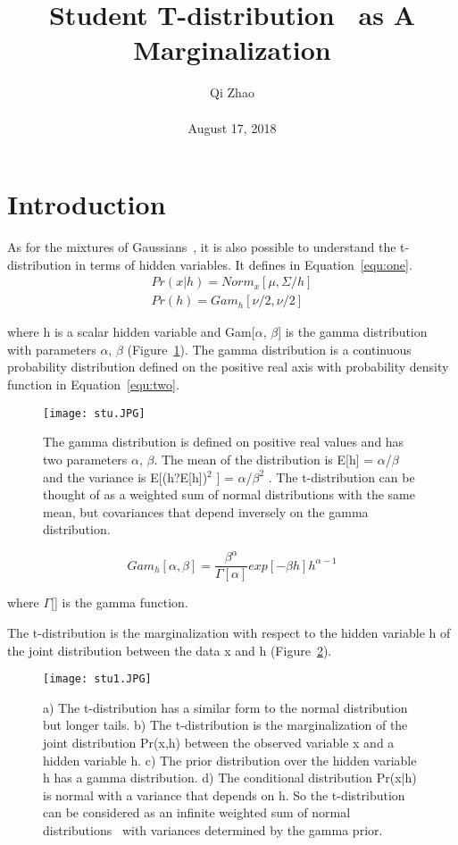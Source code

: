 \documentclass[10pt,twocolumn,letterpaper]{article}
\begin{document}
\title{ Student T-distribution~\cite{Jones2010A} as A Marginalization}
\author{Qi Zhao\\\\August 17, 2018}

\maketitle
\section{Introduction}
 As for the mixtures of Gaussians~\cite{Portilla2003Image}, it is also possible to understand the t-distribution in terms of hidden variables. It defines in Equation~\ref{equ:one}.
\begin{equation}
\begin{split}
Pr(x|h) = Norm_x[\mu, \Sigma/h] \\
Pr(h) = Gam_h[\nu/2, \nu/2]
\end{split}
\label{equ:one}
\end{equation} 

where h is a scalar hidden variable and Gam[$\alpha$, $\beta$] is the gamma distribution~\cite{Stacy1962A} with parameters $\alpha$, $\beta$ (Figure~\ref{fig:one}). The gamma distribution is a continuous probability distribution defined on the positive real axis with probability density function in Equation~\ref{equ:two}.
\begin{figure}[H]
\centering
\texttt{[image: stu.JPG]}
 \caption{  The gamma distribution is defined on positive real values and has two parameters $\alpha$, $\beta$. The mean of the distribution is E[h] = $\alpha$/$\beta$ and the variance is E[(h?E[h])$^2$ ] = $\alpha$/$\beta^2$ . The t-distribution can be thought of as a weighted sum of normal distributions with the same mean, but covariances that depend inversely on the gamma distribution.}
\label{fig:one}
\end{figure}
\begin{equation}\label{equ:two}
Gam_h[\alpha, \beta] = \frac{\beta^{\alpha}}{\Gamma[\alpha]}exp[-\beta h]h^{\alpha-1}
\end{equation}

where $\Gamma$[] is the gamma function.

The t-distribution is the marginalization with respect to the hidden variable h of the joint distribution between the data x and h (Figure~\ref{fig:two}).
\begin{figure}[H]
\centering
\texttt{[image: stu1.JPG]}
 \caption{ a) The t-distribution has a similar form to the normal distribution but longer tails. b) The t-distribution is the marginalization of the joint distribution Pr(x,h) between the observed variable x and a hidden variable h. c) The prior distribution over the hidden variable h has a gamma distribution. d) The conditional distribution Pr(x|h) is normal with a variance that depends on h. So the t-distribution can be considered as an infinite weighted sum of normal distributions~\cite{Day1969Estimating} with variances determined by the gamma prior.}
\label{fig:two}
\end{figure}
\end{document}
